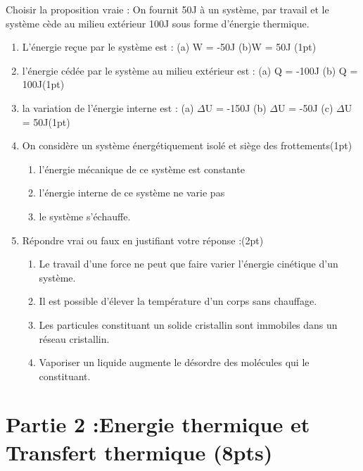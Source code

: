 \documentclass[12pt]{article}
\begin{document}
Choisir la proposition vraie :
On fournit 50J à un système, par travail et le système cède au milieu extérieur 100J sous forme
d’énergie thermique.
  \begin{enumerate}
    \item L’énergie reçue par le système est :  (a) W = -50J \hspace{1cm}(b)W = 50J \dotfill(1pt)
    \item l’énergie cédée par le système au milieu extérieur est : (a) Q = -100J \hspace{1cm} (b) Q = 100J\dotfill(1pt)

    \item la variation de l’énergie interne est :
        (a) $\Delta$U = -150J
          \hspace{1cm}(b) $\Delta$U = -50J
          \hspace{1cm}(c) $\Delta$U = 50J\dotfill(1pt)

      \item On considère un système énergétiquement isolé et siège des frottements\dotfill(1pt)

        \begin{enumerate}
          \item l’énergie mécanique de ce système est constante
          \item l’énergie interne de ce système ne varie pas
\item le système s’échauffe.
        \end{enumerate}
        \item Répondre vrai ou faux en justifiant votre réponse :\dotfill(2pt)

          \begin{enumerate}
            \item Le travail d’une force ne peut que faire varier l’énergie cinétique d’un système.
              \item Il est possible d’élever la température d’un corps sans chauffage.
                \item Les particules constituant un solide cristallin sont immobiles dans un réseau cristallin.
                \item Vaporiser un liquide augmente le désordre des molécules qui le constituant.
          \end{enumerate}
  \end{enumerate}


\section*{Partie 2 :Energie thermique et Transfert thermique \dotfill(8pts)}
\end{document}
